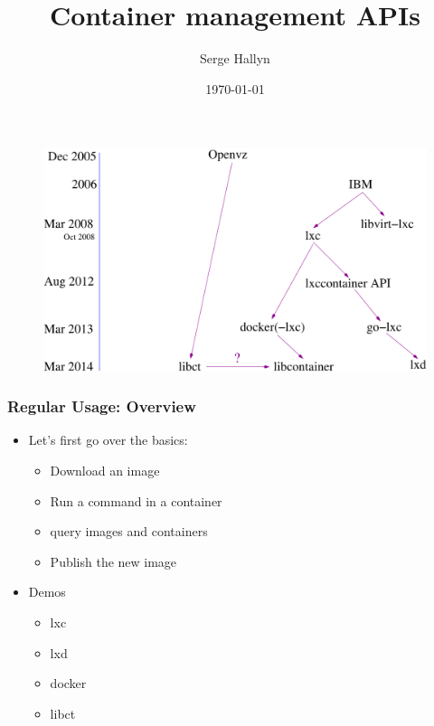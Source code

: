 \documentclass{beamer}
\title[Linux Container APIs]{Container management APIs} %
\author{Serge Hallyn} %
\institute[Canonical] %
{
Canonical, Ltd \\ %
\medskip
\textit{serge.hallyn@ubuntu.com} %
}
\date{\today} %
\begin{document}
\lstset{language=sh}

\begin{frame}
\titlepage %
\end{frame}

%



\begin{frame}
\begin{figure}
  \includegraphics[width=\textwidth]{timeline.pdf}
\end{figure}
\end{frame}

\begin{frame}
\frametitle{Regular Usage: Overview}
\begin{itemize}
\item Let's first go over the basics:
  \begin{itemize}
  \item Download an image
  \item Run a command in a container
  \item query images and containers
  \item Publish the new image
  \end{itemize}
\item Demos
  \begin{itemize}
  \item lxc
  \item lxd
  \item docker
  \item libct
  \end{itemize}
\end{itemize}
\end{frame}
\end{document}
